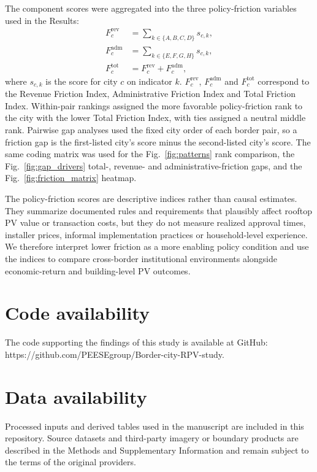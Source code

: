 \documentclass[pdflatex,sn-nature]{sn-jnl}
\begin{document}
The component scores were aggregated into the three policy-friction variables used in the Results:
\begin{align}
F^{\mathrm{rev}}_{c} &= \sum_{k\in\{A,B,C,D\}} s_{c,k},\\
F^{\mathrm{adm}}_{c} &= \sum_{k\in\{E,F,G,H\}} s_{c,k},\\
F^{\mathrm{tot}}_{c} &= F^{\mathrm{rev}}_{c}+F^{\mathrm{adm}}_{c},
\end{align}
where $s_{c,k}$ is the score for city $c$ on indicator $k$. $F^{\mathrm{rev}}_{c}$, $F^{\mathrm{adm}}_{c}$ and $F^{\mathrm{tot}}_{c}$ correspond to the Revenue Friction Index, Administrative Friction Index and Total Friction Index. Within-pair rankings assigned the more favorable policy-friction rank to the city with the lower Total Friction Index, with ties assigned a neutral middle rank. Pairwise gap analyses used the fixed city order of each border pair, so a friction gap is the first-listed city's score minus the second-listed city's score. The same coding matrix was used for the Fig.~\ref{fig:patterns} rank comparison, the Fig.~\ref{fig:gap_drivers} total-, revenue- and administrative-friction gaps, and the Fig.~\ref{fig:friction_matrix} heatmap.

The policy-friction scores are descriptive indices rather than causal estimates. They summarize documented rules and requirements that plausibly affect rooftop PV value or transaction costs, but they do not measure realized approval times, installer prices, informal implementation practices or household-level experience. We therefore interpret lower friction as a more enabling policy condition and use the indices to compare cross-border institutional environments alongside economic-return and building-level PV outcomes.


\section{Code availability}

The code supporting the findings of this study is available at GitHub: https://github.com/PEESEgroup/Border-city-RPV-study.

\section{Data availability}

Processed inputs and derived tables used in the manuscript are included in this repository. Source datasets and third-party imagery or boundary products are described in the Methods and Supplementary Information and remain subject to the terms of the original providers.



\end{document}
